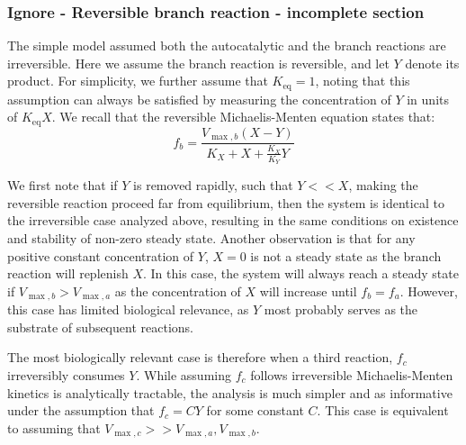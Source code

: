     \subsubsection{Ignore - Reversible branch reaction - incomplete section}
    The simple model assumed both the autocatalytic and the branch reactions are irreversible.
    Here we assume the branch reaction is reversible, and let $Y$ denote its product.
    For simplicity, we further assume that $K_{\text{eq}}=1$, noting that this assumption can always be satisfied by measuring the concentration of $Y$ in units of $K_{\text{eq}}X$.
    We recall that the reversible Michaelis-Menten equation states that:
    \begin{equation*}
        f_b=\frac{V_{\max,b}(X-Y)}{K_X+X+\frac{K_X}{K_Y}Y}
    \end{equation*}

    We first note that if $Y$ is removed rapidly, such that $Y << X$, making the reversible reaction proceed far from equilibrium, then the system is identical to the irreversible case analyzed above, resulting in the same conditions on existence and stability of non-zero steady state.
    Another observation is that for any positive constant concentration of $Y$, $X=0$ is not a steady state as the branch reaction will replenish $X$.
    In this case, the system will always reach a steady state if $V_{\max,b}>V_{\max,a}$ as the concentration of $X$ will increase until $f_b=f_a$.
    However, this case has limited biological relevance, as $Y$ most probably serves as the substrate of subsequent reactions.

    The most biologically relevant case is therefore when a third reaction, $f_c$ irreversibly consumes $Y$.
    While assuming $f_c$ follows irreversible Michaelis-Menten kinetics is analytically tractable, the analysis is much simpler and as informative under the assumption that $f_c=CY$ for some constant $C$.
    This case is equivalent to assuming that $V_{\max,c} >> V_{\max,a},V_{\max,b}$.


